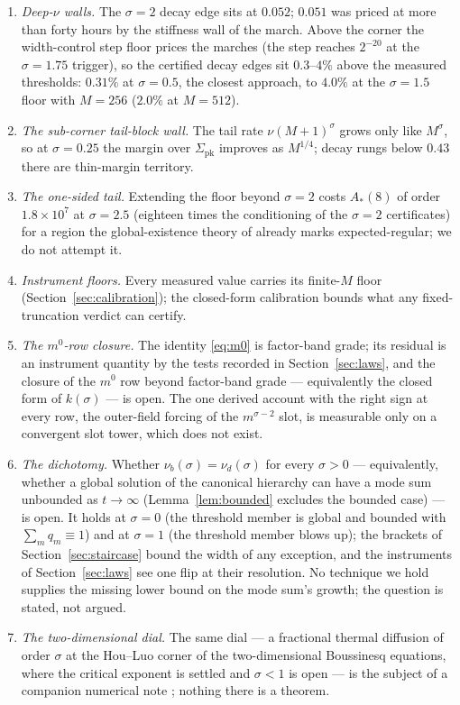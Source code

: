 \documentclass[11pt,a4paper]{article}
\theoremstyle{plain}
\theoremstyle{definition}
\newcommand{\pk}{\mathrm{pk}}
\begin{document}
\begin{enumerate}[label=(\roman*),leftmargin=2.2em]
\item \emph{Deep-$\nu$ walls.} The $\sigma=2$ decay edge sits at $0.052$; $0.051$ was priced at more than forty hours by the stiffness wall of the march. Above the corner the width-control step floor prices the marches (the step reaches $2^{-20}$ at the $\sigma=1.75$ trigger), so the certified decay edges sit $0.3$--$4\%$ above the measured thresholds: $0.31\%$ at $\sigma=0.5$, the closest approach, to $4.0\%$ at the $\sigma=1.5$ floor with $M=256$ ($2.0\%$ at $M=512$).
\item \emph{The sub-corner tail-block wall.} The tail rate $\nu(M+1)^\sigma$ grows only like $M^\sigma$, so at $\sigma=0.25$ the margin over $\Sigma_{\pk}$ improves as $M^{1/4}$; decay rungs below $0.43$ there are thin-margin territory.
\item \emph{The one-sided tail.} Extending the floor beyond $\sigma=2$ costs $A_*(8)$ of order $1.8\times10^7$ at $\sigma=2.5$ (eighteen times the conditioning of the $\sigma=2$ certificates) for a region the global-existence theory of \cite{ALSS24} already marks expected-regular; we do not attempt it.
\item \emph{Instrument floors.} Every measured value carries its finite-$M$ floor (Section~\ref{sec:calibration}); the closed-form calibration bounds what any fixed-truncation verdict can certify.
\item \emph{The $m^0$-row closure.} The identity \eqref{eq:m0} is factor-band grade; its residual is an instrument quantity by the tests recorded in Section~\ref{sec:laws}, and the closure of the $m^0$ row beyond factor-band grade --- equivalently the closed form of $k(\sigma)$ --- is open. The one derived account with the right sign at every row, the outer-field forcing of the $m^{\sigma-2}$ slot, is measurable only on a convergent slot tower, which does not exist.
\item \emph{The dichotomy.} Whether $\nu_b(\sigma)=\nu_d(\sigma)$ for every $\sigma>0$ --- equivalently, whether a global solution of the canonical hierarchy can have a mode sum unbounded as $t\to\infty$ (Lemma~\ref{lem:bounded} excludes the bounded case) --- is open. It holds at $\sigma=0$ (the threshold member is global and bounded with $\sum_mq_m\equiv1$) and at $\sigma=1$ (the threshold member blows up); the brackets of Section~\ref{sec:staircase} bound the width of any exception, and the instruments of Section~\ref{sec:laws} see one flip at their resolution. No technique we hold supplies the missing lower bound on the mode sum's growth; the question is stated, not argued.
\item \emph{The two-dimensional dial.} The same dial --- a fractional thermal diffusion of order $\sigma$ at the Hou--Luo corner of the two-dimensional Boussinesq equations, where the critical exponent is settled \cite{HKR11} and $\sigma<1$ is open --- is the subject of a companion numerical note \cite{KA26}; nothing there is a theorem.
\end{enumerate}
\end{document}
